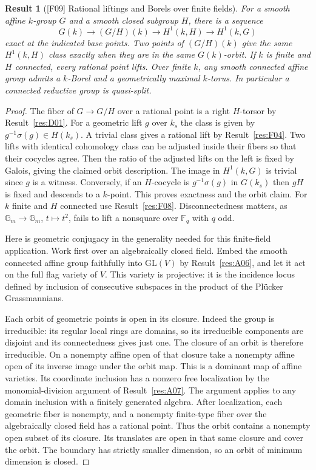 \documentclass[11pt,a4paper,openany,oneside]{book}
\theoremstyle{resultstyle}
\newtheorem{statement}{Result}[chapter]
\newenvironment{result}[2]{\clubpenalty=10000\begin{statement}[\textnormal{[#1]} #2]\leavevmode\label{res:#1}\ignorespaces}{\end{statement}}
\theoremstyle{definition}
\numberwithin{equation}{chapter}
\newcommand{\Gm}{\mathbb{G}_m}
\newcommand{\GL}{\mathrm{GL}}
\newcommand{\FF}{\mathbb{F}}
\begin{document}
\begin{result}{F09}{Rational liftings and Borels over finite fields}
For a smooth affine $k$-group $G$ and a smooth closed subgroup $H$, there is a sequence
\[
 G(k)\longrightarrow (G/H)(k)\longrightarrow H^1(k,H)\longrightarrow H^1(k,G)
\]
exact at the indicated base points. Two points of $(G/H)(k)$ give the same $H^1(k,H)$ class exactly when they are in the same $G(k)$-orbit. If $k$ is finite and $H$ connected, every rational point lifts. Over finite $k$, any smooth connected affine group admits a $k$-Borel and a geometrically maximal $k$-torus. In particular a connected reductive group is quasi-split.
\end{result}
\begin{proof}
The fiber of $G\to G/H$ over a rational point is a right $H$-torsor by Result~\ref{res:D01}. For a geometric lift $g$ over $k_s$ the class is given by $g^{-1}\sigma(g)\in H(k_s)$. A trivial class gives a rational lift by Result~\ref{res:F04}. Two lifts with identical cohomology class can be adjusted inside their fibers so that their cocycles agree. Then the ratio of the adjusted lifts on the left is fixed by Galois, giving the claimed orbit description. The image in $H^1(k,G)$ is trivial since $g$ is a witness. Conversely, if an $H$-cocycle is $g^{-1}\sigma(g)$ in $G(k_s)$ then $gH$ is fixed and descends to a $k$-point. This proves exactness and the orbit claim. For $k$ finite and $H$ connected use Result~\ref{res:F08}. Disconnectedness matters, as $\Gm\to\Gm$, $t\mapsto t^2$, fails to lift a nonsquare over $\FF_q$ with $q$ odd.

Here is geometric conjugacy in the generality needed for this
finite-field application. Work first over an algebraically closed
field. Embed the smooth connected affine group faithfully into
\(\GL(V)\) by Result~\ref{res:A06}, and let it act on the full flag
variety of \(V\). This variety is projective: it is the incidence
locus defined by inclusion of consecutive subspaces in the product
of the Pl\"ucker Grassmannians.

Each orbit of geometric points is open in its closure. Indeed the
group is irreducible: its regular local rings are domains, so its
irreducible components are disjoint and its connectedness gives just
one. The closure of an orbit is therefore irreducible. On a nonempty
affine open of that closure take a nonempty affine open of its
inverse image under the orbit map. This is a dominant map of affine
varieties. Its coordinate inclusion has a nonzero free localization
by the monomial-division argument of Result~\ref{res:A07}. The
argument applies to any domain inclusion with a finitely generated
algebra. After localization, each geometric fiber is nonempty,
and a nonempty finite-type fiber over the algebraically closed
field has a rational point. Thus the orbit contains a nonempty open
subset of its closure. Its translates are open in that same closure
and cover the orbit. The boundary has strictly smaller dimension,
so an orbit of minimum dimension is closed.


\end{proof}
\end{document}
